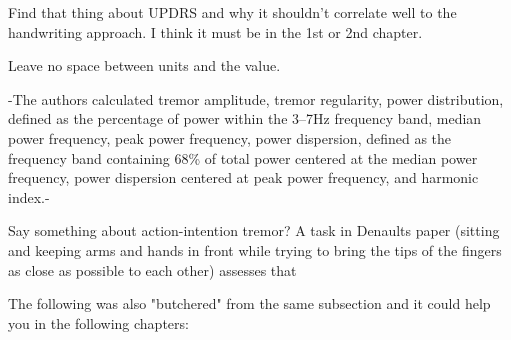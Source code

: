Find that thing about UPDRS and why it shouldn't correlate well to the handwriting approach. I think it must be in the 1st or 2nd chapter.

Leave no space between units and the value. 




-The authors calculated tremor amplitude, tremor regularity, power distribution, defined as the percentage of power within the 3–7Hz frequency band, median power frequency, peak power frequency, power dispersion, defined as the frequency band containing 68\% of total power centered at the median power frequency, power dispersion centered at peak power frequency, and harmonic index.-

Say something about action-intention tremor? A task in Denaults paper (sitting and keeping arms and hands in front while trying to bring the tips of the fingers as close as possible to each other) assesses that

The following was also "butchered" from the same subsection and it could help you in the following chapters:

